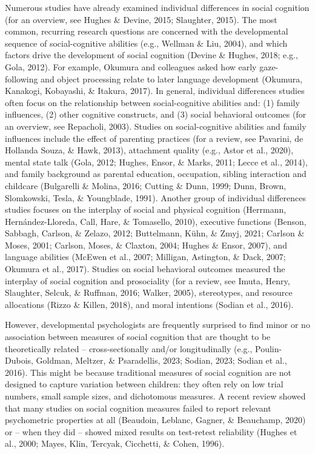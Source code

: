 \documentclass[
  man,floatsintext]{apa7}
\begin{document}
Numerous studies have already examined individual differences in social cognition (for an overview, see Hughes \& Devine, 2015; Slaughter, 2015).
The most common, recurring research questions are concerned with the developmental sequence of social-cognitive abilities (e.g., Wellman \& Liu, 2004), and which factors drive the development of social cognition (Devine \& Hughes, 2018; e.g., Gola, 2012).
For example, Okumura and colleagues asked how early gaze-following and object processing relate to later language development (Okumura, Kanakogi, Kobayashi, \& Itakura, 2017).
In general, individual differences studies often focus on the relationship between social-cognitive abilities and: (1) family influences, (2) other cognitive constructs, and (3) social behavioral outcomes (for an overview, see Repacholi, 2003).
Studies on social-cognitive abilities and family influences include the effect of parenting practices (for a review, see Pavarini, de Hollanda Souza, \& Hawk, 2013), attachment quality (e.g., Astor et al., 2020), mental state talk (Gola, 2012; Hughes, Ensor, \& Marks, 2011; Lecce et al., 2014), and family background as parental education, occupation, sibling interaction and childcare (Bulgarelli \& Molina, 2016; Cutting \& Dunn, 1999; Dunn, Brown, Slomkowski, Tesla, \& Youngblade, 1991).
Another group of individual differences studies focuses on the interplay of social and physical cognition (Herrmann, Hernández-Lloreda, Call, Hare, \& Tomasello, 2010), executive functions (Benson, Sabbagh, Carlson, \& Zelazo, 2012; Buttelmann, Kühn, \& Zmyj, 2021; Carlson \& Moses, 2001; Carlson, Moses, \& Claxton, 2004; Hughes \& Ensor, 2007), and language abilities (McEwen et al., 2007; Milligan, Astington, \& Dack, 2007; Okumura et al., 2017).
Studies on social behavioral outcomes measured the interplay of social cognition and prosociality (for a review, see Imuta, Henry, Slaughter, Selcuk, \& Ruffman, 2016; Walker, 2005), stereotypes, and resource allocations (Rizzo \& Killen, 2018), and moral intentions (Sodian et al., 2016).

However, developmental psychologists are frequently surprised to find minor or no association between measures of social cognition that are thought to be theoretically related -- cross-sectionally and/or longitudinally (e.g., Poulin-Dubois, Goldman, Meltzer, \& Psaradellis, 2023; Sodian, 2023; Sodian et al., 2016).
This might be because traditional measures of social cognition are not designed to capture variation between children: they often rely on low trial numbers, small sample sizes, and dichotomous measures.
A recent review showed that many studies on social cognition measures failed to report relevant psychometric properties at all (Beaudoin, Leblanc, Gagner, \& Beauchamp, 2020) or -- when they did -- showed mixed results on test-retest reliability (Hughes et al., 2000; Mayes, Klin, Tercyak, Cicchetti, \& Cohen, 1996).
\end{document}
